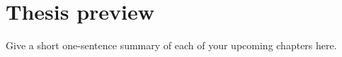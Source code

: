 \section{Thesis preview}
\label{sec:introduction/thesis_preview}

Give a short one-sentence summary of each of your upcoming chapters here.
